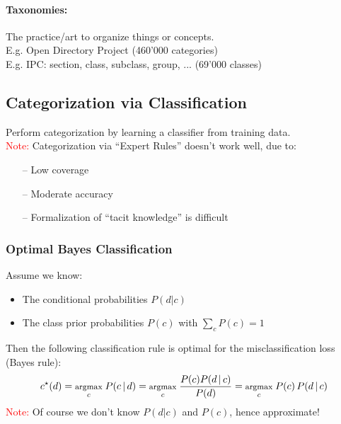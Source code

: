 \documentclass[a4paper,11pt]{article}
\begin{document}
\begin{multicols}{2}
\paragraph{Taxonomies:} The practice/art to organize things or concepts. \\
E.g. Open Directory Project (460'000 categories)\\
E.g. IPC: section, class, subclass, group, ... (69'000 classes)

\subsection{Categorization via Classification}
Perform categorization by learning a classifier from training data.\\
\textcolor{red}{Note:} Categorization via ``Expert Rules'' doesn't work well, due to:
\begin{itemize}
  \item [--] Low coverage
  \item [--] Moderate accuracy
  \item [--] Formalization of ``tacit knowledge'' is difficult
\end{itemize}

\subsubsection{Optimal Bayes Classification}
Assume we know:
\begin{itemize}
  \item The conditional probabilities $P(d|c)$
  \item The class prior probabilities $P(c)$ with $\sum_c P(c) = 1$
\end{itemize}
Then the following classification rule is optimal for the misclassification loss (Bayes rule):
\begin{align*}
\footnotesize
  c^{\star}(d) = \underset{c}{\text{argmax}} \; P(c \, | \, d) = \underset{c}{\text{argmax}} \; \frac{P(c) P(d \, | \, c)}{P(d)} = \underset{c}{\text{argmax}} \; P(c) \,  P(d \, | \, c)
\end{align*}
\textcolor{red}{Note:} Of course we don't know $P(d|c)$ and $P(c)$, hence approximate!


\end{multicols}
\end{document}
